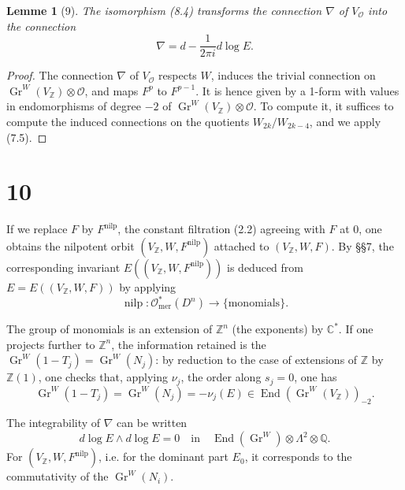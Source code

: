 \documentclass[11pt,a4paper]{article}
\theoremstyle{plain}
\newtheorem{lemma}[theorem]{Lemme}
\theoremstyle{definition}
\DeclareMathOperator{\End}{End}
\DeclareMathOperator{\Gr}{Gr}
\DeclareMathOperator{\nilp}{nilp}
\begin{document}
\begin{lemma}[9]
The isomorphism (8.4) transforms the connection $\nabla$ of $V_{\mathcal{O}}$ into the connection
\[
\nabla = d - \frac{1}{2\pi i} d\log E.
\]
\end{lemma}

\begin{proof}
The connection $\nabla$ of $V_{\mathcal{O}}$ respects $W$, induces the trivial connection on $\Gr^{W}(V_{\mathbb{Z}}) \otimes \mathcal{O}$, and maps $F^{p}$ to $F^{p-1}$. It is hence given by a 1-form with values in endomorphisms of degree $-2$ of $\Gr^{W}(V_{\mathbb{Z}}) \otimes \mathcal{O}$. To compute it, it suffices to compute the induced connections on the quotients $W_{2k}/W_{2k-4}$, and we apply (7.5).
\end{proof}

\section{10}

If we replace $F$ by $F^{\text{nilp}}$, the constant filtration (2.2) agreeing with $F$ at 0, one obtains the nilpotent orbit $(V_{\mathbb{Z}}, W, F^{\text{nilp}})$ attached to $(V_{\mathbb{Z}}, W, F)$. By \S\S 7, the corresponding invariant $E((V_{\mathbb{Z}}, W, F^{\text{nilp}}))$ is deduced from $E = E((V_{\mathbb{Z}}, W, F))$ by applying
\begin{equation}
\nilp: \mathcal{O}_{\text{mer}}^{*}(D^{n}) \to \{\text{monomials}\}. \tag{10.1}
\end{equation}

The group of monomials is an extension of $\mathbb{Z}^{n}$ (the exponents) by $\mathbb{C}^{*}$. If one projects further to $\mathbb{Z}^{n}$, the information retained is the $\Gr^{W}(1-T_{j}) = \Gr^{W}(N_{j})$: by reduction to the case of extensions of $\mathbb{Z}$ by $\mathbb{Z}(1)$, one checks that, applying $\nu_{j}$, the order along $s_{j}=0$, one has
\begin{equation}
\Gr^{W}(1-T_{j}) = \Gr^{W}(N_{j}) = -\nu_{j}(E) \in \End(\Gr^{W}(V_{\mathbb{Z}}))_{-2}. \tag{10.2}
\end{equation}

The integrability of $\nabla$ can be written
\begin{equation}
d\log E \wedge d\log E = 0 \quad \text{in} \quad \End(\Gr^{W}) \otimes \Lambda^{2} \otimes \mathbb{Q}. \tag{10.3}
\end{equation}
For $(V_{\mathbb{Z}}, W, F^{\text{nilp}})$, i.e. for the dominant part $E_{0}$, it corresponds to the commutativity of the $\Gr^{W}(N_{i})$.
\end{document}
